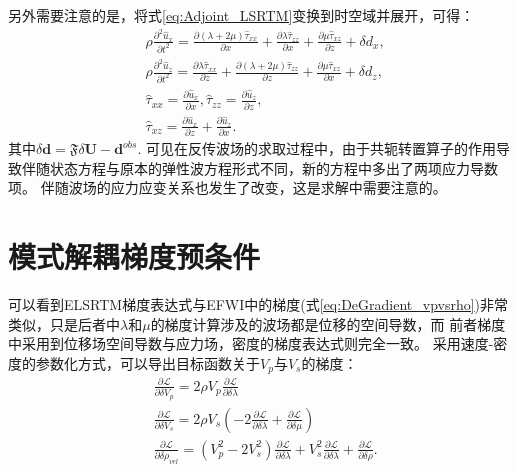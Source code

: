 另外需要注意的是，将式\eqref{eq:Adjoint_LSRTM}变换到时空域并展开，可得：
\begin{equation}
\begin{split}
	& \rho\frac{\partial^2 \hat{u}_{x}}{\partial t^2}=	\frac{\partial (\lambda+2\mu)\hat{\tau}_{xx}}{\partial x}+
		\frac{\partial \lambda\hat{\tau}_{zz}}{\partial x}+\frac{\partial \mu
			\hat{\tau}_{xz}}{\partial z}+\delta d_x,\\
		& \rho\frac{\partial^2 \hat{u}_{z}}{\partial t^2}=	\frac{\partial \lambda\hat{\tau}_{xx}}{\partial z}+
		\frac{\partial (\lambda+2\mu)\hat{\tau}_{zz}}{\partial z}+\frac{\partial \mu
			\hat{\tau}_{xz}}{\partial x}+\delta d_z,\\
		& \hat{\tau}_{xx}=\frac{\partial \hat{u}_x}{\partial x}, \hat{\tau}_{zz}=\frac{\partial \hat{u}_z}{\partial z},\\
		& \hat{\tau}_{xz}=\frac{\partial \hat{u}_x}{\partial z} + \frac{\partial \hat{u}_z}{\partial x}.
    \label{eq:Time_Adjoint_WE_LSRTM}
\end{split}
\end{equation}
其中$\delta \mathbf{d}=\mathfrak{F}\delta\mathbf{U}-\mathbf{d}^{obs}$.
可见在反传波场的求取过程中，由于共轭转置算子的作用导致伴随状态方程与原本的弹性波方程形式不同，新的方程中多出了两项应力导数项。
伴随波场的应力应变关系也发生了改变，这是求解中需要注意的。
\section{模式解耦梯度预条件}
可以看到ELSRTM梯度表达式与EFWI中的梯度(式\ref{eq:DeGradient_vpvsrho})非常类似，只是后者中$\lambda$和$\mu$的梯度计算涉及的波场都是位移的空间导数，而
前者梯度中采用到位移场空间导数与应力场，密度的梯度表达式则完全一致。
采用速度-密度的参数化方式，可以导出目标函数关于$V_p$与$V_s$的梯度：
\begin{equation}
\begin{split}
   & \frac{\partial\mathcal{L}}{\partial \delta V_p}=2\rho V_p\frac{\partial\mathcal{L}}{\partial \delta \lambda}\\
   & \frac{\partial\mathcal{L}}{\partial \delta V_s}=2\rho V_s(-2\frac{\partial\mathcal{L}}{\partial \delta \lambda}
	+\frac{\partial\mathcal{L}}{\partial \delta \mu})\\
   & \frac{\partial\mathcal{L}}{\partial \delta\rho_{vel}}=(V^2_p-2V^2_s)\frac{\partial\mathcal{L}}{\partial \delta \lambda}+V^2_s\frac{\partial\mathcal{L}}{\partial \delta \lambda}+\frac{\partial\mathcal{L}}{\partial \delta\rho}.
    \label{eq:Gradient_VpVsrho_LSRTM}
\end{split}
\end{equation}

